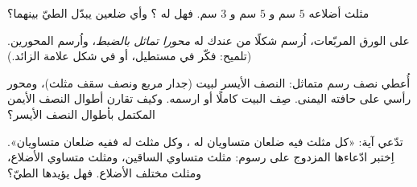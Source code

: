 \begin{exercise}[$\star$]\label{exo:g4:symmetry:8}
مثلث أضلاعه $5$ سم و $5$ سم و $3$ سم. فهل له ؟ وأي ضلعين يبدّل الطيّ بينهما؟
\end{exercise}

\begin{exercise}[$\star\star$]\label{exo:g4:symmetry:9}
على الورق المربّعات، اُرسم شكلًا من عندك له \emph{محورا تماثل
بالضبط}، واُرسم المحورين. (تلميح: فكّر في مستطيل،
أو في شكل علامة الزائد.)
\end{exercise}

\begin{exercise}[$\star\star$]\label{exo:g4:symmetry:10}
أُعطي نصف رسم متماثل: النصف الأيسر لبيت
(جدار مربع ونصف سقف مثلث)، ومحور رأسي
على حافته اليمنى. صِف البيت كاملًا أو ارسمه. وكيف تقارن
أطوال النصف الأيمن المكتمل بأطوال النصف الأيسر؟
\end{exercise}

\begin{exercise}[$\star\star$]\label{exo:g4:symmetry:11}
تدّعي آية: «كل مثلث فيه ضلعان متساويان له ، وكل مثلث له  ففيه ضلعان
متساويان». اِختبر ادّعاءها المزدوج على رسوم: مثلث متساوي الساقين،
ومثلث متساوي الأضلاع، ومثلث مختلف الأضلاع. فهل يؤيدها الطيّ؟
\end{exercise}
